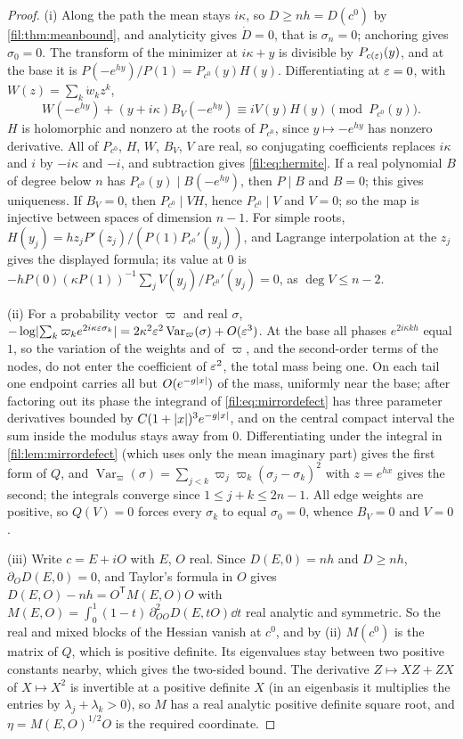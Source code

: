 \begin{proof}
(i) Along the path the mean stays $i\kappa$, so $D\ge nh=D(c^0)$ by \cref{fil:thm:meanbound}, and analyticity gives
$\dot D=0$, that is $\sigma_n=0$; anchoring gives $\sigma_0=0$. The transform of the minimizer at $i\kappa+y$ is
divisible by $P_{c(\varepsilon)}(y)$, and at the base it is $P(-e^{hy})/P(1)=P_{c^0}(y)H(y)$. Differentiating at $\varepsilon=0$,
with $W(z)=\sum_k\dot w_kz^k$,
\[
 W(-e^{hy})+(y+i\kappa)B_V(-e^{hy})\equiv iV(y)H(y)\pmod{P_{c^0}(y)} .
\]
$H$ is holomorphic and nonzero at the roots of $P_{c^0}$, since $y\mapsto-e^{hy}$ has nonzero derivative. All of
$P_{c^0}$, $H$, $W$, $B_V$, $V$ are real, so conjugating coefficients replaces $i\kappa$ and $i$ by $-i\kappa$ and
$-i$, and subtraction gives \eqref{fil:eq:hermite}. If a real polynomial $B$ of degree below $n$ has
$P_{c^0}(y)\mid B(-e^{hy})$, then $P\mid B$ and $B=0$; this gives uniqueness. If $B_V=0$, then $P_{c^0}\mid VH$,
hence $P_{c^0}\mid V$ and $V=0$; so the map is injective between spaces of dimension $n-1$. For simple roots,
$H(y_j)=hz_jP'(z_j)/(P(1)P_{c^0}'(y_j))$, and Lagrange interpolation at the $z_j$ gives the displayed formula;
its value at $0$ is $-hP(0)(\kappa P(1))^{-1}\sum_jV(y_j)/P_{c^0}'(y_j)=0$, as $\deg V\le n-2$.

(ii) For a probability vector $\varpi$ and real $\sigma$,
$-\log\lvert\sum_k\varpi_ke^{2i\kappa\varepsilon\sigma_k}\rvert=2\kappa^2\varepsilon^2\operatorname{Var}_\varpi(\sigma)+O(\varepsilon^3)$. At the base all
phases $e^{2i\kappa kh}$ equal $1$, so the variation of the weights and of $\varpi$, and the second-order terms of
the nodes, do not enter the coefficient of $\varepsilon^2$, the total mass being one. On each tail one endpoint carries
all but $O(e^{-g\lvert x\rvert})$ of the mass, uniformly near the base; after factoring out its phase the integrand of
\eqref{fil:eq:mirrordefect} has three parameter derivatives bounded by $C(1+\lvert x\rvert)^3e^{-g\lvert x\rvert}$, and on the central
compact interval the sum inside the modulus stays away from $0$. Differentiating under the integral in
\cref{fil:lem:mirrordefect} (which uses only the mean imaginary part) gives the first form of $Q$, and
$\operatorname{Var}_\varpi(\sigma)=\sum_{j<k}\varpi_j\varpi_k(\sigma_j-\sigma_k)^2$ with $z=e^{hx}$ gives the second; the integrals
converge since $1\le j+k\le2n-1$. All edge weights are positive, so $Q(V)=0$ forces every $\sigma_k$ to equal
$\sigma_0=0$, whence $B_V=0$ and $V=0$.

(iii) Write $c=E+iO$ with $E$, $O$ real. Since $D(E,0)=nh$ and $D\ge nh$, $\partial_OD(E,0)=0$, and Taylor's formula
in $O$ gives $D(E,O)-nh=O^{\mathsf T}M(E,O)O$ with $M(E,O)=\int_0^1(1-t)\,\partial^2_{OO}D(E,tO)\dd t$ real analytic and
symmetric. So the real and mixed blocks of the Hessian vanish at $c^0$, and by \textup{(ii)} $M(c^0)$ is the matrix of
$Q$, which is positive definite. Its eigenvalues stay between two positive constants nearby, which gives the
two-sided bound. The derivative $Z\mapsto XZ+ZX$ of $X\mapsto X^2$ is invertible at a positive definite $X$ (in an
eigenbasis it multiplies the entries by $\lambda_j+\lambda_k>0$), so $M$ has a real analytic positive definite
square root, and $\eta=M(E,O)^{1/2}O$ is the required coordinate.
\end{proof}

